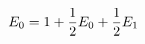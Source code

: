 \documentclass[preview]{standalone}
\begin{document}
\begin{align*}
\special{dvisvgm:raw <g id='unique000'>}E_0=1+\dfrac{1}{2}E_0+\dfrac{1}{2}E_1\special{dvisvgm:raw </g>}
\end{align*}
\end{document}
